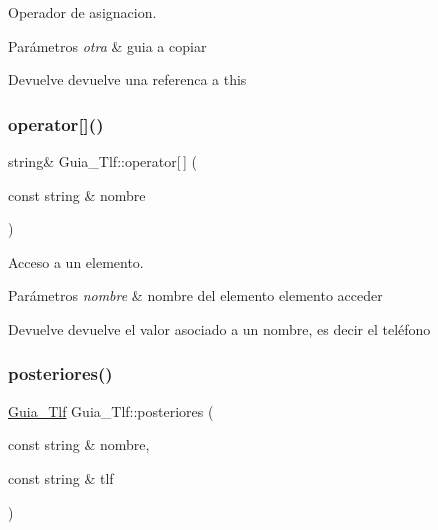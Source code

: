 Operador de asignacion. 


\begin{DoxyParams}{Parámetros}
{\em otra} & guia a copiar \\
\hline
\end{DoxyParams}
\begin{DoxyReturn}{Devuelve}
devuelve una referenca a this 
\end{DoxyReturn}
\mbox{\label{classGuia__Tlf_a6eed62abe5d13de96934e6897aaf9184}} 
\subsubsection{\texorpdfstring{operator[]()}{operator[]()}}
{\footnotesize\ttfamily string\& Guia\+\_\+\+Tlf\+::operator\mbox{[}$\,$\mbox{]} (\begin{DoxyParamCaption}\item[{const string \&}]{nombre }\end{DoxyParamCaption})}



Acceso a un elemento. 


\begin{DoxyParams}{Parámetros}
{\em nombre} & nombre del elemento elemento acceder \\
\hline
\end{DoxyParams}
\begin{DoxyReturn}{Devuelve}
devuelve el valor asociado a un nombre, es decir el teléfono 
\end{DoxyReturn}
\mbox{\label{classGuia__Tlf_a315cfa88a2536ea7e2918cb69503ef66}} 
\subsubsection{\texorpdfstring{posteriores()}{posteriores()}}
{\footnotesize\ttfamily \hyperlink{classGuia__Tlf}{Guia\+\_\+\+Tlf} Guia\+\_\+\+Tlf\+::posteriores (\begin{DoxyParamCaption}\item[{const string \&}]{nombre,  }\item[{const string \&}]{tlf }\end{DoxyParamCaption})}



